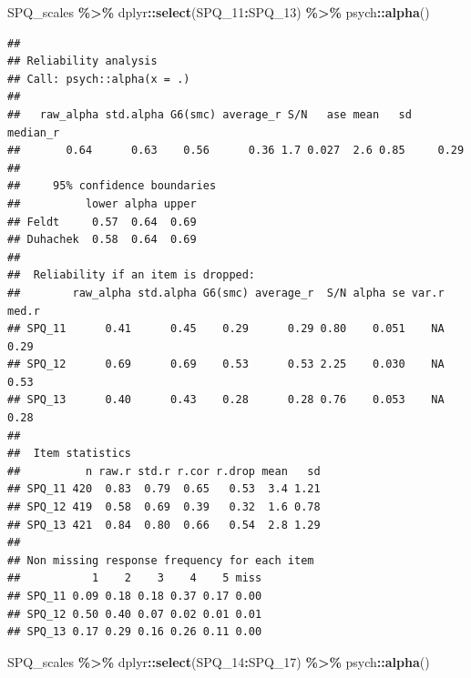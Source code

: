 \documentclass[
]{article}
\newenvironment{Shaded}{\begin{snugshade}}{\end{snugshade}}
\newcommand{\FunctionTok}[1]{\textcolor[rgb]{0.13,0.29,0.53}{\textbf{#1}}}
\newcommand{\NormalTok}[1]{#1}
\newcommand{\SpecialCharTok}[1]{\textcolor[rgb]{0.81,0.36,0.00}{\textbf{#1}}}
\begin{document}
\begin{Shaded}
\begin{Highlighting}[]
\NormalTok{SPQ\_scales }\SpecialCharTok{\%\textgreater{}\%}\NormalTok{ dplyr}\SpecialCharTok{::}\FunctionTok{select}\NormalTok{(SPQ\_11}\SpecialCharTok{:}\NormalTok{SPQ\_13) }\SpecialCharTok{\%\textgreater{}\%}\NormalTok{ psych}\SpecialCharTok{::}\FunctionTok{alpha}\NormalTok{()}
\end{Highlighting}
\end{Shaded}

\begin{verbatim}
## 
## Reliability analysis   
## Call: psych::alpha(x = .)
## 
##   raw_alpha std.alpha G6(smc) average_r S/N   ase mean   sd median_r
##       0.64      0.63    0.56      0.36 1.7 0.027  2.6 0.85     0.29
## 
##     95% confidence boundaries 
##          lower alpha upper
## Feldt     0.57  0.64  0.69
## Duhachek  0.58  0.64  0.69
## 
##  Reliability if an item is dropped:
##        raw_alpha std.alpha G6(smc) average_r  S/N alpha se var.r med.r
## SPQ_11      0.41      0.45    0.29      0.29 0.80    0.051    NA  0.29
## SPQ_12      0.69      0.69    0.53      0.53 2.25    0.030    NA  0.53
## SPQ_13      0.40      0.43    0.28      0.28 0.76    0.053    NA  0.28
## 
##  Item statistics 
##          n raw.r std.r r.cor r.drop mean   sd
## SPQ_11 420  0.83  0.79  0.65   0.53  3.4 1.21
## SPQ_12 419  0.58  0.69  0.39   0.32  1.6 0.78
## SPQ_13 421  0.84  0.80  0.66   0.54  2.8 1.29
## 
## Non missing response frequency for each item
##           1    2    3    4    5 miss
## SPQ_11 0.09 0.18 0.18 0.37 0.17 0.00
## SPQ_12 0.50 0.40 0.07 0.02 0.01 0.01
## SPQ_13 0.17 0.29 0.16 0.26 0.11 0.00
\end{verbatim}

\begin{Shaded}
\begin{Highlighting}[]
\NormalTok{SPQ\_scales }\SpecialCharTok{\%\textgreater{}\%}\NormalTok{ dplyr}\SpecialCharTok{::}\FunctionTok{select}\NormalTok{(SPQ\_14}\SpecialCharTok{:}\NormalTok{SPQ\_17) }\SpecialCharTok{\%\textgreater{}\%}\NormalTok{ psych}\SpecialCharTok{::}\FunctionTok{alpha}\NormalTok{()}
\end{Highlighting}
\end{Shaded}
\end{document}
